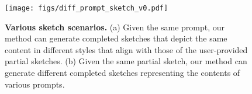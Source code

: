 \begin{figure}[!h]
  \centering
  \texttt{[image: figs/diff\_prompt\_sketch\_v0.pdf]}
  \caption{
\textbf{Various sketch scenarios.}
(a) Given the same prompt, our method can generate completed sketches that depict the same content in different styles that align with those of the user-provided partial sketches. 
(b) Given the same partial sketch, our method can generate different completed sketches representing the contents of various prompts.
}
  \label{fig:diff_promp_sketch}
\end{figure}
